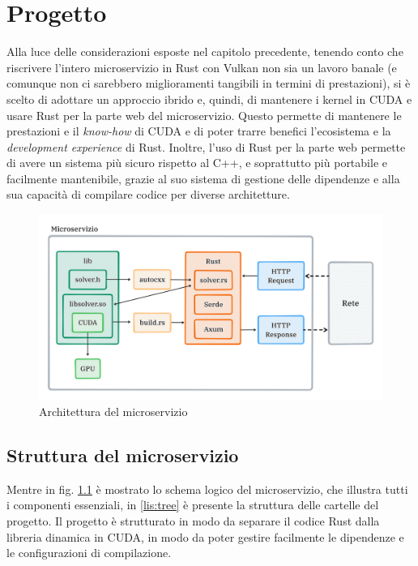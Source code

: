 \chapter{Progetto}
\label{sec:arch}

Alla luce delle considerazioni esposte nel capitolo precedente, tenendo conto che riscrivere l'intero microservizio in Rust con Vulkan non sia un lavoro banale (e comunque non ci sarebbero miglioramenti tangibili in termini di prestazioni), si è scelto di adottare un approccio ibrido e, quindi, di mantenere i kernel in \gls{CUDA} e usare Rust per la parte web del microservizio. Questo permette di mantenere le prestazioni e il \textit{know-how} di \gls{CUDA} e di poter trarre benefici l'ecosistema e la \textit{development experience} di Rust. Inoltre, l'uso di Rust per la parte web permette di avere un sistema più sicuro rispetto al C++, e soprattutto più portabile e facilmente mantenibile, grazie al suo sistema di gestione delle dipendenze e alla sua capacità di compilare codice per diverse architetture.

\begin{figure}[ht]
    \centering
    \includegraphics[width=.94\linewidth]{images/chapter6/micro_arch.png}
    \caption{Architettura del microservizio}
    \label{fig:micro_arch}
\end{figure}

\section{Struttura del microservizio}

Mentre in fig. \ref{fig:micro_arch} è mostrato lo schema logico del microservizio, che illustra tutti i componenti essenziali, in \ref{lis:tree} è presente la struttura delle cartelle del progetto. Il progetto è strutturato in modo da separare il codice Rust dalla libreria dinamica in \gls{CUDA}, in modo da poter gestire facilmente le dipendenze e le configurazioni di compilazione.

